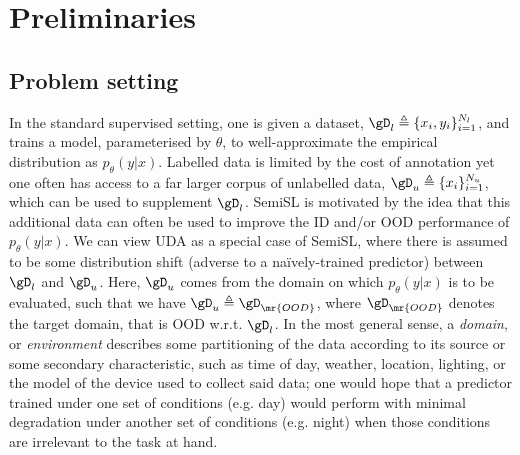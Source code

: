 \section{Preliminaries}\label{sec:prelims}
\subsection{Problem setting}
%
In the standard supervised setting, one is given a dataset, \( \gD_l \triangleq \{x_i,
y_i\}_{i=1}^{N_l} \), and trains a model, parameterised by \(\theta\), to well-approximate the
empirical distribution as \( p_\theta(y | x) \).
%
Labelled data is limited by the cost of annotation yet one often has access to a far larger corpus
of unlabelled data, \( \gD_u \triangleq \{x_i\}_{i=1}^{N_u} \), which can be used to supplement
\(\gD_l\). 
%
\Acf{SemiSL} is motivated by the idea that this additional data can often be used to improve the
\ac{ID} and/or \ac{OOD} performance of \(p_\theta(y | x)\).
%
We can view \acf{UDA} as a special case of \ac{SemiSL}, where there is assumed to be some
distribution shift (adverse to a na\"ively-trained predictor) between \( \gD_l \) and \( \gD_u \).
%
Here, \( \gD_u \) comes from the domain on which \(p_\theta(y | x)\) is to be evaluated, such that
we have \( \gD_u \triangleq \gD_\mr{OOD} \), where \( \gD_\mr{OOD} \) denotes the target domain,
that is OOD w.r.t. \( \gD_l \).
%
In the most general sense, a \emph{domain}, or \emph{environment} \citep{arjovsky2019invariant,
creager2021environment} describes some partitioning of the data according to its source or some
secondary characteristic, such as time of day, weather, location, lighting, or the model of the
device used to collect said data; one would hope that a predictor trained under one set of
conditions (e.g. day) would perform with minimal degradation under another set of conditions (e.g.
night) when those conditions are irrelevant to the task at hand.
%

